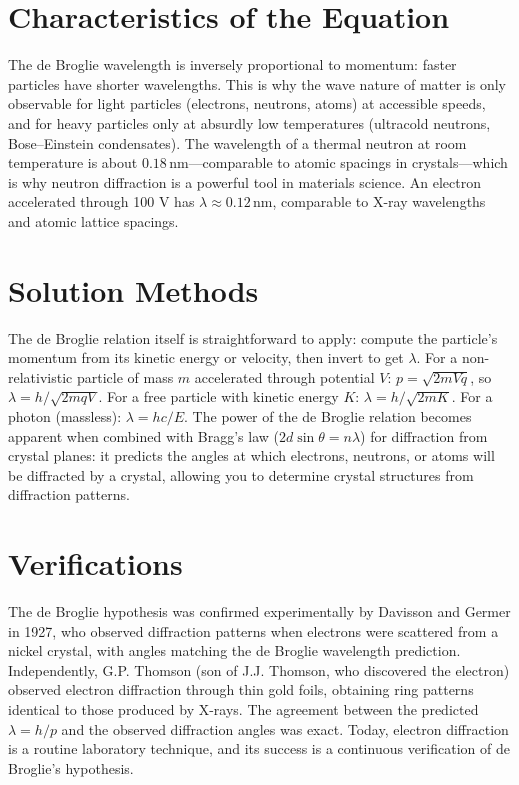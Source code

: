 \section*{Characteristics of the Equation}

The de Broglie wavelength is inversely proportional to momentum: faster particles have shorter wavelengths. This is why the wave nature of matter is only observable for light particles (electrons, neutrons, atoms) at accessible speeds, and for heavy particles only at absurdly low temperatures (ultracold neutrons, Bose--Einstein condensates). The wavelength of a thermal neutron at room temperature is about $0.18\,\text{nm}$---comparable to atomic spacings in crystals---which is why neutron diffraction is a powerful tool in materials science. An electron accelerated through 100 V has $\lambda \approx 0.12\,\text{nm}$, comparable to X-ray wavelengths and atomic lattice spacings.
\section*{Solution Methods}

The de Broglie relation itself is straightforward to apply: compute the particle's momentum from its kinetic energy or velocity, then invert to get $\lambda$. For a non-relativistic particle of mass $m$ accelerated through potential $V$: $p = \sqrt{2mVq}$, so $\lambda = h/\sqrt{2mqV}$. For a free particle with kinetic energy $K$: $\lambda = h/\sqrt{2mK}$. For a photon (massless): $\lambda = hc/E$. The power of the de Broglie relation becomes apparent when combined with Bragg's law ($2d\sin\theta = n\lambda$) for diffraction from crystal planes: it predicts the angles at which electrons, neutrons, or atoms will be diffracted by a crystal, allowing you to determine crystal structures from diffraction patterns.
\section*{Verifications}

The de Broglie hypothesis was confirmed experimentally by Davisson and Germer in 1927, who observed diffraction patterns when electrons were scattered from a nickel crystal, with angles matching the de Broglie wavelength prediction. Independently, G.P. Thomson (son of J.J. Thomson, who discovered the electron) observed electron diffraction through thin gold foils, obtaining ring patterns identical to those produced by X-rays. The agreement between the predicted $\lambda = h/p$ and the observed diffraction angles was exact. Today, electron diffraction is a routine laboratory technique, and its success is a continuous verification of de Broglie's hypothesis.
